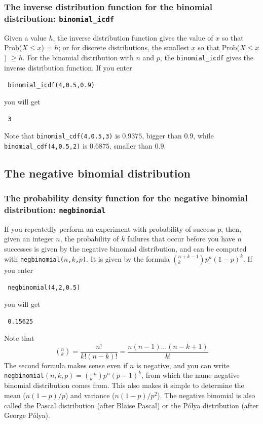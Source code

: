 \documentclass[a4paper,11pt]{book}
\begin{document}
\subsubsection{The inverse distribution function for the binomial
distribution: \texttt{binomial\_icdf}}

Given a value $h$, the inverse distribution function gives the value
of $x$ so that Prob($X \le x$) = $h$; or for discrete distributions,
the smallest $x$ so that Prob($X \le x$) $\ge h$.  For the binomial
distribution with $n$ and $p$, the \texttt{binomial\_icdf} gives the
inverse distribution function.  If you enter
\begin{center}
  \tt
  binomial\_icdf(4,0.5,0.9)
\end{center}
you will get
\begin{center}
  \tt
  3
\end{center}
Note that \texttt{binomial\_cdf(4,0.5,3)}
is $0.9375$, bigger than $0.9$, while 
\texttt{binomial\_cdf(4,0.5,2)} is $0.6875$, smaller than $0.9$.

\subsection{The negative binomial distribution}

\subsubsection{The probability density function for the negative
binomial distribution: \texttt{negbinomial}}
If you repeatedly perform an experiment with probability of success
$p$, then, given an integer $n$, the probability of $k$ failures that occur
before you have $n$ successes is given by the negative binomial
distribution, and can be computed with
\texttt{negbinomial($n$,$k$,$p$)}.  It is given by the formula
$\left(^{n+k-1}_{k}\right)p^n(1-p)^k$.  If you enter
\begin{center}
  \tt
  negbinomial(4,2,0.5)
\end{center}
you will get
\begin{center}
  \tt
  0.15625
\end{center}

Note that
\[
\left(^{n}_{k}\right) = \frac{n!}{k! (n-k)!} = \frac{n (n-1 ) \dots (
n-k+1)}{k!}
\]
The second formula makes sense even if $n$ is negative, and you can
write
\texttt{negbinomial}$(n,k,p) = \left(^{-n}_{k}\right)p^n (p-1)^k$, from
which the name negative binomial distribution comes from.  This also
makes it simple to determine the mean ($n(1-p)/p$) and variance
($n(1-p)/p^2$).  The negative binomial is also called the Pascal
distribution (after Blaise Pascal) or the P\'{o}lya distribution
(after George P\'{o}lya).
\end{document}
